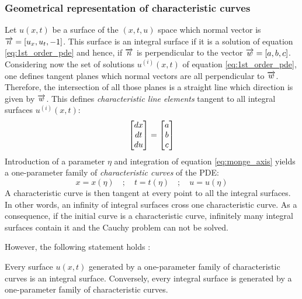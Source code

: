 \subsubsection*{Geometrical representation of characteristic curves}
Let $u(x,t)$ be a surface of the $(x,t,u)$ space which normal vector is ${\overrightarrow{n}}=[u_x,u_t,-1]$. This surface is an integral surface if it is a solution of equation \eqref{eq:1st_order_pde} and hence, if ${\overrightarrow{n}}$ is perpendicular to the vector ${\overrightarrow{w}}=[a,b,c]$. Considering now the set of solutions $u^{(i)}(x,t)$ of equation \eqref{eq:1st_order_pde}, one defines tangent planes which normal vectors are all perpendicular to ${\overrightarrow{w}}$. Therefore, the intersection of all those planes is a straight line which direction is given by ${\overrightarrow{w}}$.
This defines \textit{characteristic line elements} tangent to all integral surfaces $u^{(i)}(x,t)$:
\begin{equation}
  \label{eq:monge_axis}
  \left[\begin{matrix}dx \\ dt \\ du\end{matrix}\right] = \left[\begin{matrix}a \\ b \\c\end{matrix}\right]
\end{equation}
Introduction of a parameter $\eta$ and integration of equation \eqref{eq:monge_axis} yields a one-parameter family of \textit{characteristic curves} of the PDE:
\begin{equation*}
  x=x(\eta) \quad ; \quad t=t(\eta) \quad ; \quad u=u(\eta)
\end{equation*}
A characteristic curve is then tangent at every point to all the integral surfaces. In other words, an infinity of integral surfaces cross one characteristic curve. As a consequence, if the initial curve is a characteristic curve, infinitely many integral surfaces contain it and the Cauchy problem can not be solved.

However, the following statement holds \cite[Ch.1]{Courant}:
\begin{theorem}
  \label{th:integral_surface_generated}
  Every surface $u(x,t)$ generated by a one-parameter family of characteristic curves is an integral surface. Conversely, every integral surface is generated by a one-parameter family of characteristic curves.
\end{theorem}


